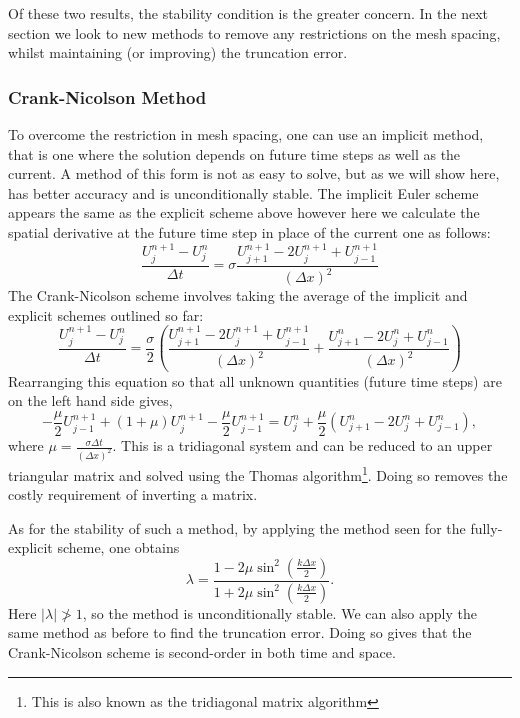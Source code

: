 \documentclass[11pt, a4pape draft]{article}
\newcommand{\Dt}{\Delta t}
\newcommand{\Dx}{\Delta x}
\begin{document}
        Of these two results, the stability condition is the greater concern. In the next section we look to new methods to remove any restrictions on the mesh spacing, whilst maintaining (or improving) the truncation error.
        
        \subsubsection*{Crank-Nicolson Method}
        To overcome the restriction in mesh spacing, one can use an implicit method, that is one where the solution depends on future time steps as well as the current. A method of this form is not as easy to solve, but as we will show here, has better accuracy and is unconditionally stable. The implicit Euler scheme appears the same as the explicit scheme above however here we calculate the spatial derivative at the future time step in place of the current one as follows:
        \[
          \frac{U^{n+1}_{j}  - U^{n}_{j}}{\Dt} = \sigma \frac{U^{n+1}_{j+1}-2U^{n+1}_{j}+U^{n+1}_{j-1}}{(\Dx)^2}
        \]
        The Crank-Nicolson scheme involves taking the average of the implicit and explicit schemes outlined so far:
        \[
             \frac{U^{n+1}_{j}-U^{n}_{j}}{\Dt} = \frac{\sigma}{2}\left(\frac{U^{n+1}_{j+1}-2U^{n+1}_{j}+U^{n+1}_{j-1}}{(\Dx)^2}+\frac{U^{n}_{j+1}-2U^{n}_{j}+U^{n}_{j-1}}{(\Dx)^2}\right)
        \]
        Rearranging this equation so that all unknown quantities (future time steps) are on the left hand side gives,
            \[
                -\frac{\mu}{2} U^{n+1}_{j-1} + (1+\mu)U^{n+1}_{j} - \frac{\mu}{2} U^{n+1}_{j-1} = U^{n}_{j} + \frac{\mu}{2} \left( U^{n}_{j+1} - 2U^{n}_{j}+U^{n}_{j-1}\right),
            \]
        where $\mu = \frac{\sigma \Dt}{(\Dx)^2 }$. This is a tridiagonal system and can be reduced to an upper triangular matrix and solved using the Thomas algorithm\footnote{This is also known as the tridiagonal matrix algorithm}. Doing so removes the costly requirement of inverting a matrix.

        As for the stability of such a method, by applying the method seen for the fully-explicit scheme, one obtains 
        \[
            \lambda = \frac{1-2\mu\sin^2\left(\frac{k\Dx}{2}\right)}{1+2\mu\sin^2\left(\frac{k\Dx}{2}\right)}.
        \]
        Here $|\lambda| \not> 1$, so the method is unconditionally stable. We can also apply the same method as before to find the truncation error. Doing so gives that the Crank-Nicolson scheme is second-order in both time and space.
        
\end{document}
